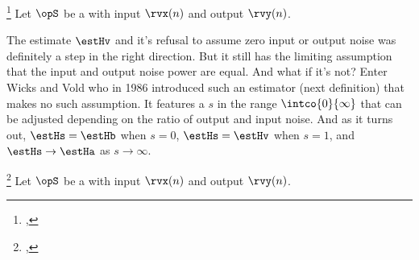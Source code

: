 \begin{definition}
\footnote{
  ,
  }
\label{def:Hv}
Let $\opS$ be a  with input $\rvx(n)$ and output $\rvy(n)$.
\end{definition}

The estimate $\estHv$ and it's refusal to assume zero input or output noise
was definitely a step in the right direction.
But it still has the limiting assumption that the input and output noise power are equal.
And what if it's not?
Enter Wicks and Vold who in 1986 introduced such an estimator (next definition)
that makes no such assumption.
It features a  $s$ in the range $\intco{0}{\infty}$
that can be adjusted depending on the ratio of output and input noise.
And as it turns out, $\estHs = \estHb$ when $s=0$, $\estHs=\estHv$ when $s=1$, and
$\estHs\to\estHa$ as $s\to\infty$. %
\begin{definition}
\footnote{
  ,
  }
\label{def:Hs}
Let $\opS$ be a  with input $\rvx(n)$ and output $\rvy(n)$.
\end{definition}

